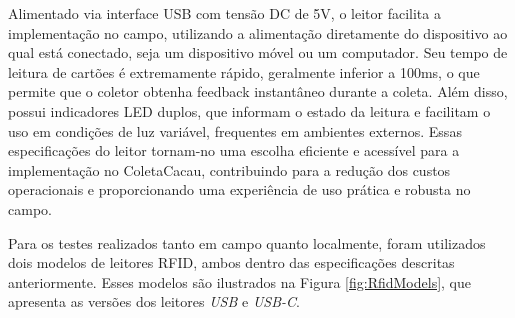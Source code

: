 Alimentado via interface USB com tensão DC de 5V, o leitor facilita a implementação no campo, utilizando a alimentação diretamente do dispositivo ao qual está conectado, seja um dispositivo móvel ou um computador. Seu tempo de leitura de cartões é extremamente rápido, geralmente inferior a 100ms, o que permite que o coletor obtenha feedback instantâneo durante a coleta. Além disso, possui indicadores LED duplos, que informam o estado da leitura e facilitam o uso em condições de luz variável, frequentes em ambientes externos. Essas especificações do leitor tornam-no uma escolha eficiente e acessível para a implementação no ColetaCacau, contribuindo para a redução dos custos operacionais e proporcionando uma experiência de uso prática e robusta no campo.

Para os testes realizados tanto em campo quanto localmente, foram utilizados dois modelos de leitores RFID, ambos dentro das especificações descritas anteriormente. Esses modelos são ilustrados na Figura \ref{fig:RfidModels}, que apresenta as versões dos leitores \textit{USB} e \textit{USB-C}. 


